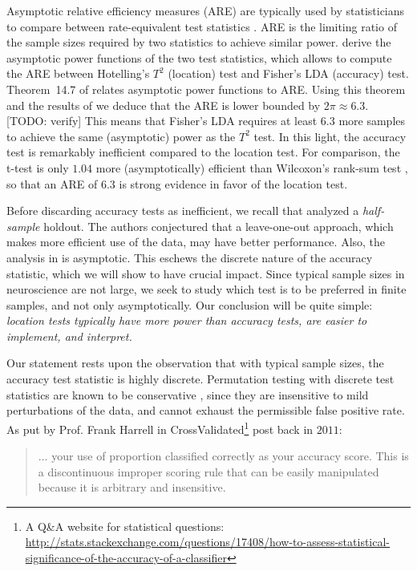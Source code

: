 \documentclass[12pt,a4paper]{article}
\begin{document}
Asymptotic relative efficiency measures (ARE) are typically used by statisticians to compare between rate-equivalent test statistics \citep{vaart_asymptotic_1998}.
ARE is the limiting ratio of the sample sizes required by two statistics to achieve similar power. 
\cite{ramdas_classification_2016} derive the asymptotic power functions of the two test statistics, which allows to compute the ARE between Hotelling's $T^2$ (location) test and Fisher's LDA (accuracy) test.
Theorem~14.7 of \cite{vaart_asymptotic_1998} relates asymptotic power functions to ARE.
Using this theorem and the results of \cite{ramdas_classification_2016} we deduce that the ARE is lower bounded by $2 \pi \approx 6.3$. [TODO: verify]
This means that Fisher's LDA requires at least $6.3$ more samples to achieve the same (asymptotic) power as the $T^2$ test. 
In this light, the accuracy test is remarkably inefficient compared to the location test.  
For comparison, the t-test is only $1.04$ more (asymptotically) efficient than Wilcoxon's rank-sum test \citep{lehmann_parametric_2009}, so that an ARE of $6.3$ is strong evidence in favor of the location test. 

Before discarding accuracy tests as inefficient, we recall that \cite{ramdas_classification_2016} analyzed a \emph{half-sample} holdout. 
The authors conjectured that a leave-one-out approach, which makes more efficient use of the data, may have better performance. 
Also, the analysis in \cite{ramdas_classification_2016} is asymptotic. 
This eschews the discrete nature of the accuracy statistic, which we will show to have  crucial impact. 
Since typical sample sizes in neuroscience are not large, we seek to study which test is to be preferred in finite samples, and not only asymptotically.
Our conclusion will be quite simple: {\em location tests typically have more power than accuracy tests, are easier to implement, and interpret.}

Our statement rests upon the observation that with typical sample sizes, the accuracy test statistic is highly discrete. 
Permutation testing with discrete test statistics are known to be conservative \citep{hemerik_exact_2014}, since they are insensitive to mild perturbations of the data, and cannot exhaust the permissible false positive rate. 
As put by Prof. Frank Harrell in \textsf{CrossValidated\footnote{A Q\&A website for statistical questions: \url{http://stats.stackexchange.com/questions/17408/how-to-assess-statistical-significance-of-the-accuracy-of-a-classifier}}} post back in $2011$:
\begin{quote}
	... your use of proportion classified correctly as your accuracy score. This is a discontinuous improper scoring rule that can be easily manipulated because it is arbitrary and insensitive.
\end{quote}
\end{document}

